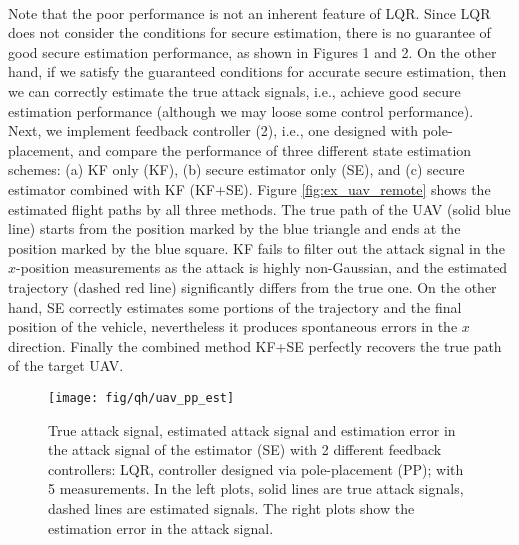 \documentclass[twocolumn]{autart}    %
\newcommand{\rev}[1]{{\normalsize{{{\color{blue}#1}}}}}
\newcommand{\qie}[1]{{\normalsize{{{\color{magenta}#1}}}}}
\begin{document}
\\
\rev{ %
Note that the poor performance is not an inherent feature of LQR. 
Since LQR does not consider the conditions for secure estimation, there is no guarantee of good secure estimation performance, as shown in Figures 1 and 2.
On the other hand, if we satisfy the guaranteed conditions for accurate secure estimation, then we can correctly estimate the true attack signals, i.e., achieve good secure estimation performance (although we may loose some control performance).}
\\
Next, we implement feedback controller (2), i.e., one designed with pole-placement, and compare the performance of three different state estimation schemes: (a) KF only (KF), (b) secure estimator only (SE), and (c) secure estimator combined with KF (KF+SE). 
Figure \ref{fig:ex_uav_remote} shows the estimated flight paths by all three methods.
The true path of the UAV (solid blue line) starts from the position marked by the blue triangle and ends at the position marked by the blue square. KF fails to filter out the attack signal in the $x$-position measurements as the attack is highly non-Gaussian, and the estimated trajectory (dashed red line) significantly differs from the true one. On the other hand, SE correctly estimates some portions of the trajectory and the final position of the vehicle, nevertheless it produces spontaneous errors in the $x$ direction. 
Finally the combined method KF+SE perfectly recovers the true path of the target UAV.


\begin{figure}
\center
\texttt{[image: fig/qh/uav\_pp\_est]}
\caption{True attack signal, estimated attack signal and estimation error in the attack signal of the estimator (SE) with 2 different feedback controllers: LQR, controller designed via pole-placement (PP); with 5 measurements. In the left plots, solid lines are true attack signals, dashed lines are estimated signals. The right plots show the estimation error in the attack signal.}
\label{fig:ex_pp_est}
\end{figure}
\end{document}
